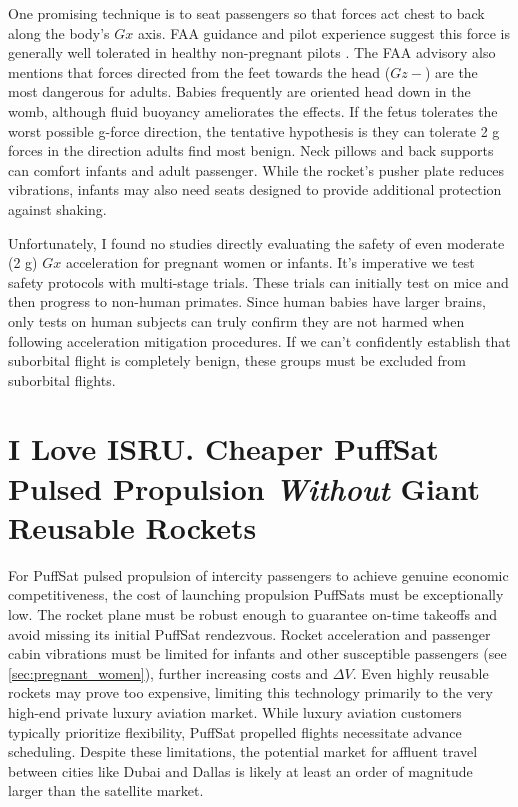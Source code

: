 \documentclass{article}
\begin{document}
{One promising technique is to seat passengers so that forces act chest to back along the body’s $Gx$ axis.   FAA guidance and pilot experience suggest this  force is generally well tolerated in healthy non-pregnant pilots \cite{lateral_acceleration}.  The FAA advisory also mentions that forces directed from the feet towards the head ($Gz-$) are the most dangerous for adults.   Babies frequently are oriented head down in the womb, although fluid buoyancy ameliorates the effects.    If the fetus tolerates the worst possible g-force direction, the tentative hypothesis is they can tolerate 2 g forces in the direction adults find most benign.  Neck pillows and back supports can comfort infants and adult passenger.  While the rocket's pusher plate reduces vibrations, infants may also need seats designed to provide additional protection against shaking.

Unfortunately, I found no studies directly evaluating the safety of even moderate (2 g) $Gx$ acceleration for pregnant women or infants. It's imperative we test safety protocols with  multi-stage trials.   These trials can initially test on mice and then progress to non-human primates.  Since human babies have larger brains, only tests on human subjects can truly confirm they are not harmed when following acceleration mitigation procedures.  If we can't confidently establish that suborbital flight is completely benign, these groups must be excluded from suborbital flights.  

\section{I Love ISRU.  Cheaper PuffSat Pulsed Propulsion \textit{Without} Giant Reusable Rockets}
For PuffSat pulsed propulsion of intercity passengers to achieve genuine economic competitiveness, the cost of launching  propulsion PuffSats must be exceptionally low.  The rocket plane must be robust enough to guarantee on-time takeoffs and avoid missing its initial PuffSat rendezvous.  Rocket acceleration and passenger cabin vibrations must be limited for infants and other susceptible passengers (see \autoref{sec:pregnant_women}), further increasing costs and $\Delta V$.  Even highly reusable rockets may prove too expensive, limiting this technology primarily to the very high-end private luxury aviation market. While luxury aviation customers typically prioritize flexibility, PuffSat propelled flights necessitate advance scheduling.  Despite these limitations, the potential market for affluent travel between cities like Dubai and Dallas is likely at least an order of magnitude larger than the satellite market.

}
\end{document}

